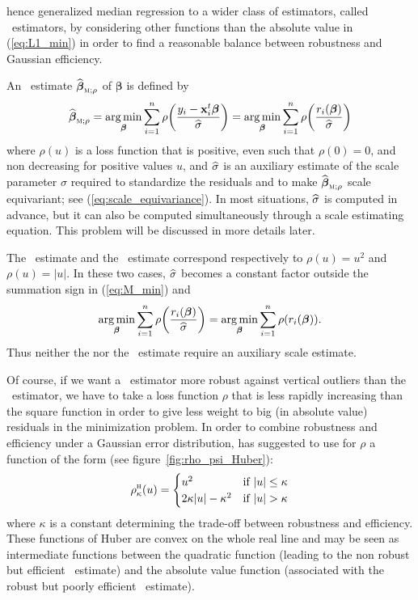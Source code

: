 \citet{huber64} hence generalized median regression to a wider class of
estimators, called ~estimators, by considering other functions than
the absolute value in (\ref{eq:L1_min}) in order to find a reasonable balance
between robustness and Gaussian efficiency.

An ~estimate $\sthat{\boldsymbol\beta}_{\stsc{M};\rho}$ of
$\boldsymbol\beta$ is defined by
%
\begin{equation}
    \label{eq:M_min}
    \sthat{\boldsymbol\beta}_{\stsc{M};\rho} 
        = \argmin_{\boldsymbol\beta}\sum_{i=1}^{n} 
            \rho\left(\frac{y_i - \stvec{x}_i^t\boldsymbol\beta}{\sthat{\sigma}}\right)
        = \argmin_{\boldsymbol\beta}\sum_{i=1}^{n}
            \rho\left(\frac{r_i(\boldsymbol\beta)}{\sthat{\sigma}}\right)
\end{equation}
%
where $\rho(u)$ is a loss function that is positive, even such that $\rho(0) =
0$, and non decreasing for positive values $u$, and $\widehat{\sigma}$ is an
auxiliary estimate of the scale parameter $\sigma$ required to standardize the
residuals and to make $\sthat{\boldsymbol\beta}_{\stsc{M};\rho}$ scale
equivariant; see (\ref{eq:scale_equivariance}). In most situations,
$\widehat{\sigma}$ is computed in advance, but it can also be computed
simultaneously through a scale  estimating equation. This problem will
be discussed in more details later.

\begin{stremark}
The ~estimate and the ~estimate correspond respectively to
$\rho(u) = u^2$ and $\rho(u) = |u|$. In these two cases, $\widehat{\sigma}$
becomes a constant factor outside the summation sign in (\ref{eq:M_min}) and
\[
    \argmin_{\boldsymbol\beta} \sum_{i=1}^{n} \rho\left(\frac{r_i(\boldsymbol\beta)}{\sthat{\sigma}}\right)
    = \argmin_{\boldsymbol\beta}\sum_{i=1}^{n}\rho(r_i(\boldsymbol\beta)).
\]
Thus neither the  nor the ~estimate require an auxiliary
scale estimate.
\end{stremark}

Of course, if we want a ~estimator more robust against vertical
outliers than the ~estimator, we have to take a loss function $\rho$
that is less rapidly increasing than the square function in order to give less
weight to big (in absolute value) residuals in the minimization problem. In
order to combine robustness and efficiency under a Gaussian error distribution,
\citet{huber64} has suggested to use for $\rho$ a function of the form (see
figure~\ref{fig:rho_psi_Huber}):
\[
    \rho_{\kappa}^{\stsc{H}}(u) = 
    \begin{cases}
        u^2                    & \text{if $|u| \leq \kappa$}\\
        2\kappa |u| - \kappa^2 & \text{if $|u| > \kappa$}
    \end{cases}
\]
where $\kappa$ is a constant determining the trade-off between robustness and
efficiency. These functions of Huber are convex on the whole real line and may
be seen as intermediate functions between the quadratic function (leading to
the non robust but efficient ~estimate) and the absolute value function
(associated with the robust but poorly efficient ~estimate).

